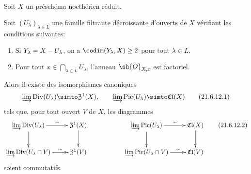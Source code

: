 \begin{proposition}[21.6.12]
\label{IV.21.6.12}
Soit $X$ un préschéma noethérien réduit.

Soit $(U_\lambda)_{\lambda\in L}$ une famille filtrante décroissante d'ouverts de $X$ vérifiant les conditions suivantes:
\begin{enumerate}
  \item[\rm 1\textsuperscript{o}] Si $Y_\lambda=X- U_\lambda$, on a $\codim(Y_\lambda,X)\geq2$ pour tout $\lambda\in L$.
  \item[\rm 2\textsuperscript{o}] Pour tout $x\in\bigcap_{\lambda\in L}U_\lambda$, l'anneau $\sh{O}_{X,x}$ est factoriel.
\end{enumerate}

Alors il existe des isomorphismes canoniques
\[
\label{IV.21.6.12.1}
  \varinjlim\operatorname{Div}(U_\lambda)\simto\mathfrak{Z}^1(X),\qquad
  \varinjlim\operatorname{Pic}(U_\lambda)\simto\mathfrak{Cl}(X)
  \tag{21.6.12.1}
\]
tels que, pour tout ouvert $V$ de $X$, les diagrammes
\[
\label{IV.21.6.12.2}
  \xymatrix{
    \varinjlim\operatorname{Div}(U_\lambda) \ar[r]^-\sim \ar[d] & \mathfrak{Z}^1(X) \ar[d] & & \varinjlim\operatorname{Pic}(U_\lambda) \ar[r]^-\sim \ar[d] & \mathfrak{Cl}(X) \ar[d]\\
    \varinjlim\operatorname{Div}(U_\lambda\cap V) \ar[r]^-\sim & \mathfrak{Z}^1(V) & & \varinjlim\operatorname{Pic}(U_\lambda\cap V) \ar[r]^-\sim & \mathfrak{Cl}(V)
  }
  \tag{21.6.12.2}
\]
soient commutatifs.
\end{proposition}

